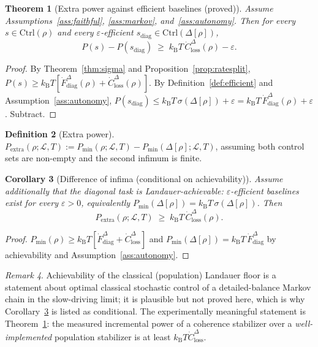\documentclass[11pt,a4paper]{article}
\theoremstyle{plain}
\newtheorem{theorem}{Theorem}[section]
\newtheorem{corollary}[theorem]{Corollary}
\theoremstyle{definition}
\newtheorem{definition}[theorem]{Definition}
\theoremstyle{remark}
\newtheorem{remark}[theorem]{Remark}
\newcommand{\kB}{k_{\mathrm{B}}}
\newcommand{\Ctrl}{\mathrm{Ctrl}}
\newcommand{\Pmin}{P_{\min}}
\newcommand{\Pextra}{P_{\mathrm{extra}}}
\newcommand{\Closs}{\dot{C}^{\Delta}_{\mathrm{loss}}}
\newcommand{\Fdiag}{\dot{F}^{\Delta}_{\mathrm{diag}}}
\begin{document}
\begin{theorem}[Extra power against efficient baselines (proved)]
\label{thm:extra}
Assume Assumptions~\ref{ass:faithful}, \ref{ass:markov},
and~\ref{ass:autonomy}. Then for every $s \in \Ctrl(\rho)$ and every
$\varepsilon$-efficient $s_{\mathrm{diag}} \in \Ctrl(\Delta[\rho])$,
\begin{equation}
P(s) - P(s_{\mathrm{diag}}) \;\ge\; \kB T\, \Closs(\rho) - \varepsilon.
\end{equation}
\end{theorem}

\begin{proof}
By Theorem~\ref{thm:sigma} and Proposition~\ref{prop:ratesplit},
$P(s) \ge \kB T[\Fdiag(\rho) + \Closs(\rho)]$. By
Definition~\ref{def:efficient} and Assumption~\ref{ass:autonomy},
$P(s_{\mathrm{diag}}) \le \kB T\,\sigma(\Delta[\rho]) + \varepsilon =
\kB T\,\Fdiag(\rho) + \varepsilon$. Subtract.
\end{proof}

\begin{definition}[Extra power]\label{def:extra}
$\displaystyle \Pextra(\rho; \mathcal{L}, T) := \Pmin(\rho; \mathcal{L}, T) -
\Pmin(\Delta[\rho]; \mathcal{L}, T)$, assuming both control sets are non-empty
and the second infimum is finite.
\end{definition}

\begin{corollary}[Difference of infima (conditional on achievability)]
\label{cor:diffinf}
Assume additionally that the diagonal task is \emph{Landauer-achievable}:
$\varepsilon$-efficient baselines exist for every $\varepsilon > 0$,
equivalently $\Pmin(\Delta[\rho]) = \kB T\,\sigma(\Delta[\rho])$. Then
\begin{equation}
\Pextra(\rho; \mathcal{L}, T) \;\ge\; \kB T\, \Closs(\rho).
\end{equation}
\end{corollary}

\begin{proof}
$\Pmin(\rho) \ge \kB T[\Fdiag + \Closs]$ and
$\Pmin(\Delta[\rho]) = \kB T\,\Fdiag$ by achievability and
Assumption~\ref{ass:autonomy}.
\end{proof}

\begin{remark}
Achievability of the classical (population) Landauer floor is a statement about
optimal classical stochastic control of a detailed-balance Markov chain in the
slow-driving limit; it is plausible but not proved here, which is why
Corollary~\ref{cor:diffinf} is listed as conditional. The experimentally
meaningful statement is Theorem~\ref{thm:extra}: the measured incremental power
of a coherence stabilizer over a \emph{well-implemented} population stabilizer
is at least $\kB T \Closs$.
\end{remark}
\end{document}

